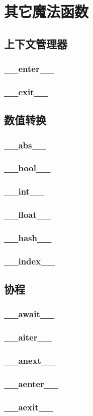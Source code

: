 \section{其它魔法函数}

\subsection{上下文管理器}
\subsubsection{\_\_enter\_\_}
\subsubsection{\_\_exit\_\_}

\subsection{数值转换}
\subsubsection{\_\_abs\_\_}
\subsubsection{\_\_bool\_\_}
\subsubsection{\_\_int\_\_}
\subsubsection{\_\_float\_\_}
\subsubsection{\_\_hash\_\_}
\subsubsection{\_\_index\_\_}

\subsection{协程}
\subsubsection{\_\_await\_\_}
\subsubsection{\_\_aiter\_\_}
\subsubsection{\_\_anext\_\_}
\subsubsection{\_\_aenter\_\_}
\subsubsection{\_\_aexit\_\_}